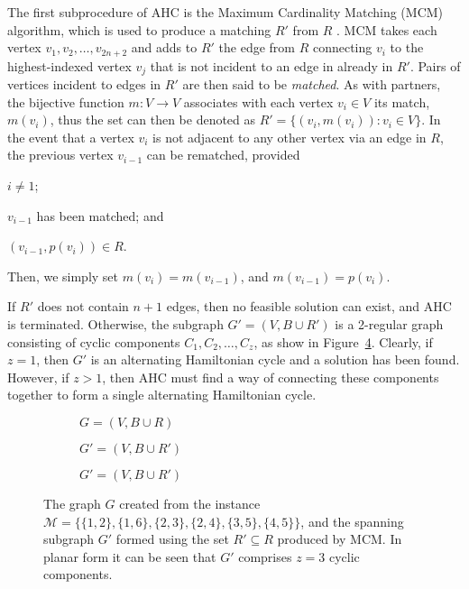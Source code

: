 \documentclass{elsarticle}
\begin{document}
The first subprocedure of AHC is the Maximum Cardinality Matching (MCM) algorithm, which is used to produce a matching $R'$ from $R$ \cite{mahadev1994}. MCM takes each vertex $v_1, v_2,\dotsc,v_{2n+2}$ and adds to $R'$ the edge from $R$ connecting $v_i$ to the highest-indexed vertex $v_j$ that is not incident to an edge in already in $R'$. Pairs of vertices incident to edges in $R'$ are then said to be \emph{matched}. As with partners, the bijective function $m : V \to V$ associates with each vertex $v_i \in V$ its match, $m(v_i)$, thus the set can then be denoted as $R' = \{(v_i, m(v_i)): v_i \in V\}$. In the event that a vertex $v_i$ is not adjacent to any other vertex via an edge in $R$, the previous vertex $v_{i-1}$ can be rematched, provided 
\begin{enumerate*}[label={(\alph*)}]
	\item $i \neq 1$;
	\item $v_{i-1}$ has been matched; and
	\item $(v_{i-1}, p(v_i)) \in R$.
\end{enumerate*} 
Then, we simply set $m(v_i) = m(v_{i-1})$, and $m(v_{i-1}) = p(v_i)$.

If $R'$ does not contain $n+1$ edges, then no feasible solution can exist, and AHC is terminated. Otherwise, the subgraph $G'=(V, B \cup R')$ is a 2-regular graph consisting of cyclic components $C_1,C_2,\dotsc,C_z$, as show in Figure~\ref{fig:mcm}. Clearly, if $z = 1$, then $G'$ is an alternating Hamiltonian cycle and a solution has been found. However, if $z > 1$, then AHC must find a way of connecting these components together to form a single alternating Hamiltonian cycle.

\begin{figure}[H]	
	\centering
	\begin{subfigure}[h]{0.3\textwidth}
		
		\caption{$G = (V, B \cup R)$}
		\label{fig:threshold}
	\end{subfigure} \hspace{5mm}
	\begin{subfigure}[h]{0.3\textwidth}
		
		\caption{$G' = (V, B \cup R')$}
		\label{fig:matching}
	\end{subfigure} \hspace{5mm}
	\begin{subfigure}[h]{0.243\textwidth}
		
		\caption{$G' = (V, B \cup R')$ }
		\label{fig:mps}
	\end{subfigure}
	\caption{The graph $G$ created from the instance $\mathcal{M} = \{\{1,2\}, \{1,6\}, \{2,3\}, \{2,4\}, \{3,5\}, \{4,5\}\}$, and the spanning subgraph $G'$ formed using the set $R' \subseteq R$ produced by MCM. In planar form it can be seen that $G'$ comprises $z = 3$ cyclic components. }
	\label{fig:mcm}
\end{figure}
\end{document}
